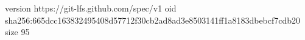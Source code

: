 version https://git-lfs.github.com/spec/v1
oid sha256:665dcc163832495408d57712f30cb2ad8ad3e8503141ff1a8183dbebcf7cdb20
size 95
